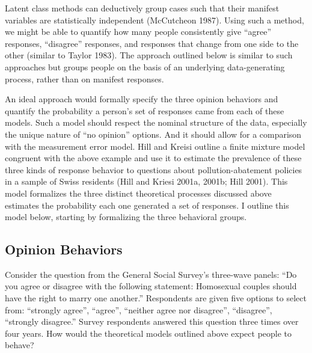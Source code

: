\documentclass[12pt,]{article}
\begin{document}
Latent class methods can deductively group cases such that their manifest variables are statistically independent (McCutcheon 1987). Using such a method, we might be able to quantify how many people consistently give ``agree'' responses, ``disagree'' responses, and responses that change from one side to the other (similar to Taylor 1983). The approach outlined below is similar to such approaches but groups people on the basis of an underlying data-generating process, rather than on manifest responses.

An ideal approach would formally specify the three opinion behaviors and quantify the probability a person's set of responses came from each of these models. Such a model should respect the nominal structure of the data, especially the unique nature of ``no opinion'' options. And it should allow for a comparison with the measurement error model. Hill and Kreisi outline a finite mixture model congruent with the above example and use it to estimate the prevalence of these three kinds of response behavior to questions about pollution-abatement policies in a sample of Swiss residents (Hill and Kriesi 2001a, 2001b; Hill 2001). This model formalizes the three distinct theoretical processes discussed above estimates the probability each one generated a set of responses. I outline this model below, starting by formalizing the three behavioral groups.

\hypertarget{opinion-behaviors}{%
\subsection{Opinion Behaviors}\label{opinion-behaviors}}

Consider the question from the General Social Survey's three-wave panels: ``Do you agree or disagree with the following statement: Homosexual couples should have the right to marry one another.'' Respondents are given five options to select from: ``strongly agree'', ``agree'', ``neither agree nor disagree'', ``disagree'', ``strongly disagree.'' Survey respondents answered this question three times over four years. How would the theoretical models outlined above expect people to behave?
\end{document}
